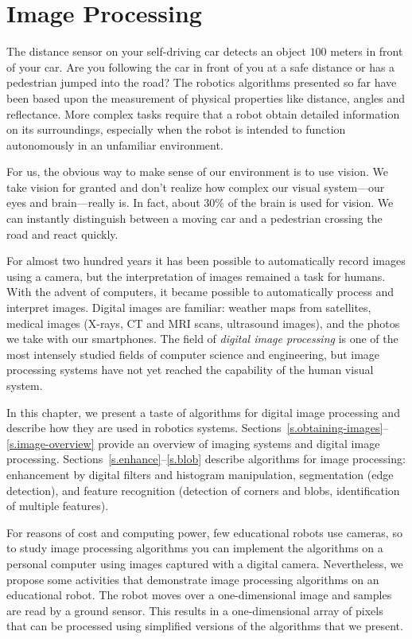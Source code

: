 
\chapter{Image Processing}\label{ch.image}

The distance sensor on your self-driving car detects an object $100$ meters in front of your car. Are you following the car in front of you at a safe distance or has a pedestrian jumped into the road? The robotics algorithms presented so far have been based upon the measurement of physical properties like distance, angles and reflectance. More complex tasks require that a robot obtain detailed information on its surroundings, especially when the robot is intended to function autonomously in an unfamiliar environment.

For us, the obvious way to make sense of our environment is to use vision. We take vision for granted and don't realize how complex our visual system---our eyes and brain---really is. In fact, about $30\%$ of the brain is used for vision. We can instantly distinguish between a moving car and a pedestrian crossing the road and react quickly.

For almost two hundred years it has been possible to automatically record images using a camera, but the interpretation of images remained a task for humans. With the advent of computers, it became possible to automatically process and interpret images. Digital images are familiar: weather maps from satellites, medical images (X-rays, CT and MRI scans, ultrasound images), and the photos we take with our smartphones. The field of \emph{digital image processing} is one of the most intensely studied fields of computer science and engineering, but image processing systems have not yet reached the capability of the human visual system.

In this chapter, we present a taste of algorithms for digital image processing and describe how they are used in robotics systems. Sections~\ref{s.obtaining-images}--\ref{s.image-overview} provide an overview of imaging systems and digital image processing. Sections~\ref{s.enhance}--\ref{s.blob} describe algorithms for image processing: enhancement by digital filters and histogram manipulation, segmentation (edge detection), and feature recognition (detection of corners and blobs, identification of multiple features).

For reasons of cost and computing power, few educational robots use cameras, so to study image processing algorithms you can implement the algorithms on a personal computer using images captured with a digital camera. Nevertheless, we propose some activities that demonstrate image processing algorithms on an educational robot. The robot moves over a one-dimensional image and samples are read by a ground sensor. This results in a one-dimensional array of pixels that can be processed using simplified versions of the algorithms that we present.

